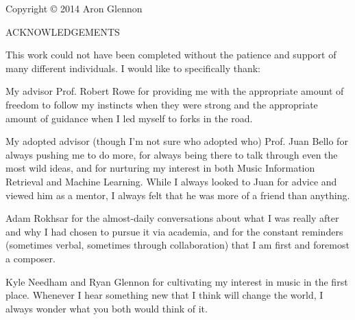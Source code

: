 \documentclass[12pt]{report} 	%
\numberwithin{figure}{chapter}
\numberwithin{table}{chapter}
\numberwithin{equation}{chapter}
\begin{document}
\begin{flushleft}				%
\setlength{\parindent}{30pt}	%

\begin{copyrightpage}
\thispagestyle{empty}
\vspace*{\fill}
\begin{center}
Copyright \copyright{} 2014 Aron Glennon
\end{center}
\vspace*{\fill}
\end{copyrightpage}
\clearpage
{}			%
\doublespacing

\renewcommand\abstractname{\normalfont \large ACKNOWLEDGEMENTS}
\doublespacing
\thispagestyle{plain}
\setcounter{page}{3}
\begingroup
\begin{center}
    \fontsize{14pt}{17pt}\selectfont
    ACKNOWLEDGEMENTS
\end{center}
\endgroup
\hspace*{\parindent}This work could not have been completed without the patience and support of many different individuals. I would like to specifically thank:

My advisor Prof. Robert Rowe for providing me with the appropriate amount of freedom to follow my instincts when they were strong and the appropriate amount of guidance when I led myself to forks in the road.

My adopted advisor (though I'm not sure who adopted who) Prof. Juan Bello for always pushing me to do more, for always being there to talk through even the most wild ideas, and for nurturing my interest in both Music Information Retrieval and Machine Learning. While I always looked to Juan for advice and viewed him as a mentor, I always felt that he was more of a friend than anything.

Adam Rokhsar for the almost-daily conversations about what I was really after and why I had chosen to pursue it via academia, and for the constant reminders (sometimes verbal, sometimes through collaboration) that I am first and foremost a composer.

Kyle Needham and Ryan Glennon for cultivating my interest in music in the first place. Whenever I hear something new that I think will change the world, I always wonder what you both would think of it.


\end{flushleft}
\end{document}
